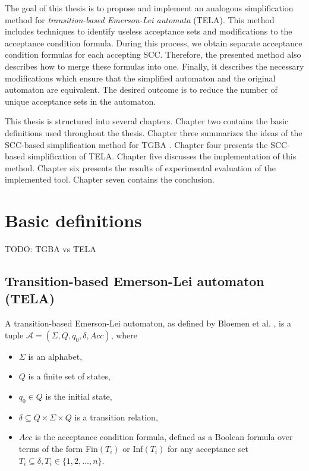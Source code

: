 \documentclass[
  digital, %
  twoside, %
  table,   %
  lof,     %
  lot,     %
]{fithesis3}
\begin{document}
The goal of this thesis is to propose and implement an analogous simplification method for \emph{transition-based Emerson-Lei automata} (TELA). This method includes techniques to identify useless acceptance sets and modifications to the acceptance condition formula. During this process, we obtain separate acceptance condition formulas for each accepting SCC. Therefore, the presented method also describes how to merge these formulas into one. Finally, it describes the necessary modifications which ensure that the simplified automaton and the original automaton are equivalent. The desired outcome is to reduce the number of unique acceptance sets in the automaton. 

This thesis is structured into several chapters. Chapter two contains the basic definitions used throughout the thesis. Chapter three summarizes the ideas of the SCC-based simplification method for TGBA \cite{spin2013}. Chapter four presents the SCC-based simplification of TELA. Chapter five discusses the implementation of this method. Chapter six presents the results of experimental evaluation of the implemented tool. Chapter seven contains the conclusion. 

\chapter{Basic definitions}
\label{chap:basic_definitions}
TODO: TGBA vs TELA

\section{Transition-based Emerson-Lei automaton (TELA)} 
\label{sec:tela}
A transition-based Emerson-Lei automaton, as defined by Bloemen et al. \cite{bloemen2017}, is a tuple $\mathcal{A} = (\Sigma, Q, q_0, \delta, Acc)$, where
\begin{itemize}
  \item $\Sigma$ is an alphabet,
  \item $Q$ is a finite set of states,
  \item $q_0 \in Q$ is the initial state,
  \item $\delta \subseteq Q \times \Sigma \times Q$ is a transition relation,
  \item $Acc$ is the acceptance condition formula, defined as a Boolean formula over terms of the form Fin$(T_i)$ or Inf$(T_i)$ for any acceptance set $T_i \subseteq \delta, T_i \in \{1, 2, \dots, n\}$. 
\end{itemize}
\end{document}
